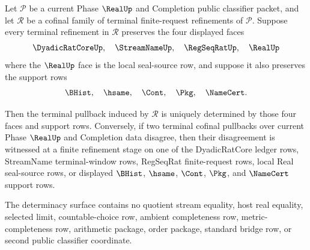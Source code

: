 \begin{theorem}
\label{thm:real-l10-terminal-cofinal-pullback-determinacy}
Let $\mathcal P$ be a current Phase $\RealUp$ and Completion public classifier packet, and let $\mathcal R$ be a cofinal family of terminal finite-request refinements of $\mathcal P$. Suppose every terminal refinement in $\mathcal R$ preserves the four displayed faces
$$
\DyadicRatCoreUp,\quad \StreamNameUp,\quad \RegSeqRatUp,\quad \RealUp
$$
where the $\RealUp$ face is the local seal-source row, and suppose it also preserves the support rows
$$
\BHist,\quad \hsame,\quad \Cont,\quad \Pkg,\quad \NameCert.
$$

Then the terminal pullback induced by $\mathcal R$ is uniquely determined by those four faces and support rows. Conversely, if two terminal cofinal pullbacks over current Phase $\RealUp$ and Completion data disagree, then their disagreement is witnessed at a finite refinement stage on one of the DyadicRatCore ledger rows, StreamName terminal-window rows, RegSeqRat finite-request rows, local Real seal-source rows, or displayed $\BHist$, $\hsame$, $\Cont$, $\Pkg$, and $\NameCert$ support rows.

The determinacy surface contains no quotient stream equality, host real equality, selected limit, countable-choice row, ambient completeness row, metric-completeness row, arithmetic package, order package, standard bridge row, or second public classifier coordinate.
\end{theorem}
